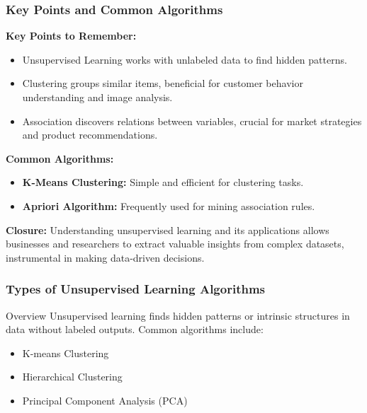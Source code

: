 \documentclass[aspectratio=169]{beamer}
\begin{document}
\begin{frame}[fragile]
  \frametitle{Key Points and Common Algorithms}
  \textbf{Key Points to Remember:}
  \begin{itemize}
    \item Unsupervised Learning works with unlabeled data to find hidden patterns.
    \item Clustering groups similar items, beneficial for customer behavior understanding and image analysis.
    \item Association discovers relations between variables, crucial for market strategies and product recommendations.
  \end{itemize}
  
  \textbf{Common Algorithms:}
  \begin{itemize}
    \item \textbf{K-Means Clustering:} Simple and efficient for clustering tasks.
    \item \textbf{Apriori Algorithm:} Frequently used for mining association rules.
  \end{itemize}
  
  \textbf{Closure:} Understanding unsupervised learning and its applications allows businesses and researchers to extract valuable insights from complex datasets, instrumental in making data-driven decisions.
\end{frame}

\begin{frame}[fragile]
    \frametitle{Types of Unsupervised Learning Algorithms}
    \begin{block}{Overview}
        Unsupervised learning finds hidden patterns or intrinsic structures in data without labeled outputs. 
        Common algorithms include:
        \begin{itemize}
            \item K-means Clustering
            \item Hierarchical Clustering
            \item Principal Component Analysis (PCA)
        \end{itemize}
    \end{block}
\end{frame}
\end{document}
